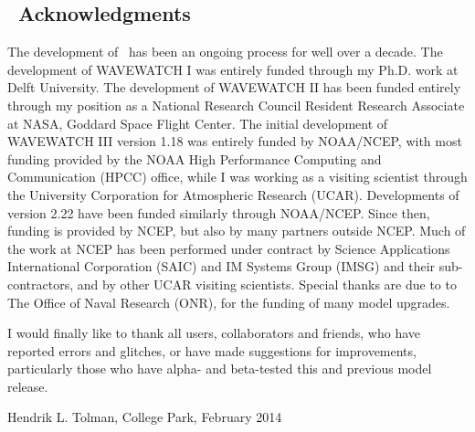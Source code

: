 \vssub
\subsection{~Acknowledgments}
\vssub

The development of \ws\ has been an ongoing process for well over a
decade. The development of WAVEWATCH I was entirely funded through my
Ph.D. work at Delft University. The development of WAVEWATCH II has been
funded entirely through my position as a National Research Council Resident
Research Associate at NASA, Goddard Space Flight Center. The initial
development of WAVEWATCH III version 1.18 was entirely funded by NOAA/NCEP,
with most funding provided by the NOAA High Performance Computing and
Communication (HPCC) office, while I was working as a visiting scientist
through the University Corporation for Atmospheric Research (UCAR).
Developments of version 2.22 have been funded similarly through NOAA/NCEP.
Since then, funding is provided by NCEP, but also by many partners outside
NCEP. Much of the work at NCEP has been performed under contract by Science
Applications International Corporation (SAIC) and IM Systems Group (IMSG) and
their sub-contractors, and by other UCAR visiting scientists.  Special thanks
are due to to The Office of Naval Research (ONR), for the funding of many
model upgrades.

I would finally like to thank all users, collaborators and friends, who have
reported errors and glitches, or have made suggestions for improvements,
particularly those who have alpha- and beta-tested this and previous model
release.

\vspace{\baselineskip}
\vspace{\baselineskip} 
\strut \hfill Hendrik L. Tolman, College Park, February 2014
